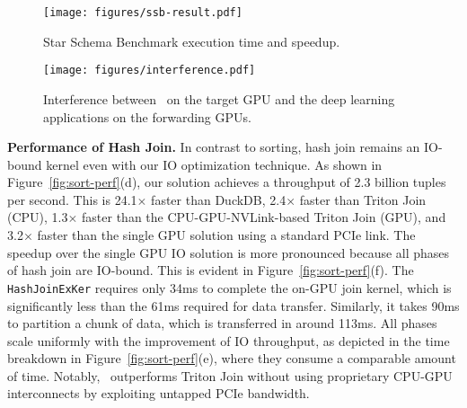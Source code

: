 \begin{figure*}[t]
\centerline{\texttt{[image: figures/ssb-result.pdf]}}
\caption{Star Schema Benchmark execution time and speedup.}
\label{fig:ssb-perf}
\end{figure*}
\begin{figure}
    \centering
    \texttt{[image: figures/interference.pdf]}
    \caption{Interference between \THISWORK\ on the target GPU and the deep learning applications on the forwarding GPUs. 
    }
    \label{fig:interference}
\end{figure}
\noindent
\textbf{Performance of Hash Join.}
In contrast to sorting, hash join remains an IO-bound kernel even with our IO optimization technique. 
As shown in Figure~\ref{fig:sort-perf}(d), our solution achieves a throughput of 2.3 billion tuples per second. 
This is 24.1$\times$ faster than DuckDB, 2.4$\times$ faster than Triton Join (CPU), 1.3$\times$ faster than the CPU-GPU-NVLink-based Triton Join (GPU), and 3.2$\times$ faster than the single GPU solution using a standard PCIe link.
The speedup over the single GPU IO solution is more pronounced because all phases of hash join are IO-bound. 
This is evident in Figure~\ref{fig:sort-perf}(f). 
The \texttt{HashJoinExKer} requires only 34ms to complete the on-GPU join kernel, which is significantly less than the 61ms required for data transfer.
Similarly, it takes 90ms to partition a chunk of data, which is transferred in around 113ms. 
All phases scale uniformly with the improvement of IO throughput, as depicted in the time breakdown in Figure~\ref{fig:sort-perf}(e), where they consume a comparable amount of time. 
Notably, \THISWORK\ outperforms Triton Join without using proprietary CPU-GPU interconnects by exploiting untapped PCIe bandwidth.


